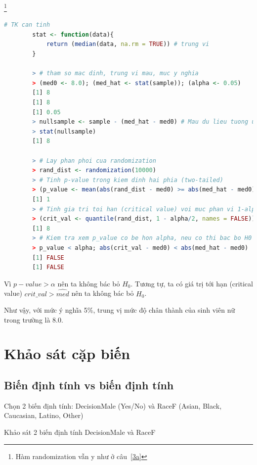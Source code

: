 \documentclass[a4paper,12pt]{article}
\begin{document}
\begin{enumerate}[label = \alph*)]
		\footnote{Hàm randomization vẫn y như ở câu~\ref{3a}}
		\begin{lstlisting}[language=R]
		# TK can tinh
		stat <- function(data){
			return (median(data, na.rm = TRUE)) # trung vi
		}
		
		> # tham so mac dinh, trung vi mau, muc y nghia
		> (med0 <- 8.0); (med_hat <- stat(sample)); (alpha <- 0.05)
		[1] 8
		[1] 8
		[1] 0.05
		> nullsample <- sample - (med_hat - med0) # Mau du lieu tuong ung voi H0
		> stat(nullsample)
		[1] 8
		 
		> # Lay phan phoi cua randomization
		> rand_dist <- randomization(10000)
		> # Tinh p-value trong kiem dinh hai phia (two-tailed)
		> (p_value <- mean(abs(rand_dist - med0) >= abs(med_hat - med0)))
		[1] 1
		> # Tinh gia tri toi han (critical value) voi muc phan vi 1-alpha/2
		> (crit_val <- quantile(rand_dist, 1 - alpha/2, names = FALSE))
		[1] 8
		> # Kiem tra xem p_value co be hon alpha, neu co thi bac bo H0
		> p_value < alpha; abs(crit_val - med0) < abs(med_hat - med0)
		[1] FALSE
		[1] FALSE
		\end{lstlisting}
		
		Vì $p-value > \alpha$ nên ta không bác bỏ $H_0$. Tương tự, ta có giá trị tới hạn (critical value) $crit\_val > \hat{med}$ nên ta không bác bỏ $H_0$. 
		
		Như vậy, với mức ý nghĩa 5\%, trung vị mức độ chân thành của sinh viên nữ trong trường là $8.0$. 
	\end{enumerate}
	
	\section{Khảo sát cặp biến}
	\subsection{Biến định tính vs biến định tính}
	Chọn 2 biến định tính: DecisionMale (Yes/No) và RaceF (Asian, Black, Caucasian, Latino, Other)
	
	Khảo sát 2 biến định tính DecisionMale và RaceF
	
\end{document}
